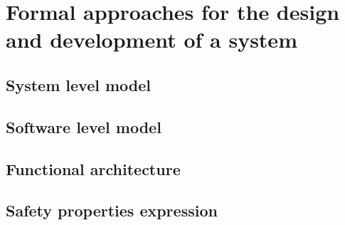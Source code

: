 


\section{Formal approaches for the design and development of a system}


\begin{comment}
This section will describe how formal methods are involved in the design of critical system.
\end{comment}



\subsection{System level model}

\subsection{Software level model}

\subsection{Functional architecture}

\subsection{Safety properties expression}






